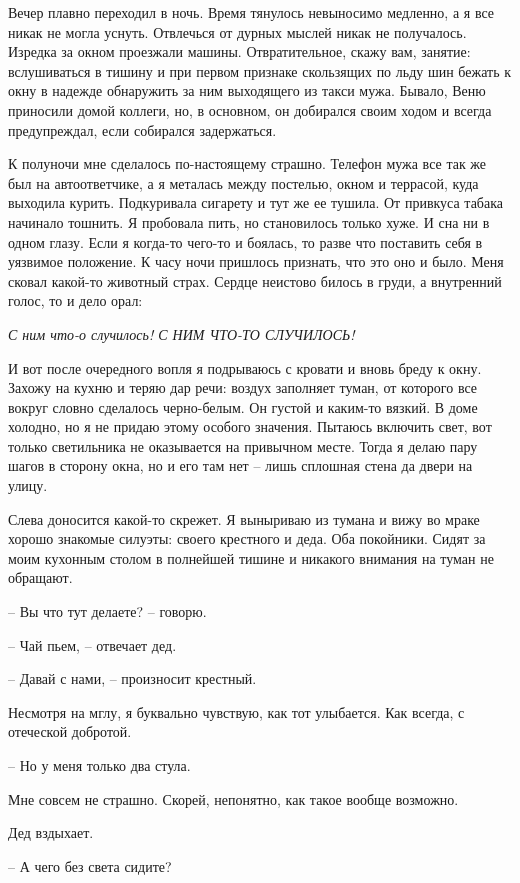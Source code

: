 \documentclass[
]{book}
\begin{document}
Вечер плавно переходил в ночь. Время тянулось невыносимо медленно, а я все никак не могла уснуть. Отвлечься от дурных мыслей никак не получалось. Изредка за окном проезжали машины. Отвратительное, скажу вам, занятие: вслушиваться в тишину и при первом признаке скользящих по льду шин бежать к окну в надежде обнаружить за ним выходящего из такси мужа. Бывало, Веню приносили домой коллеги, но, в основном, он добирался своим ходом и всегда предупреждал, если собирался задержаться.

К полуночи мне сделалось по-настоящему страшно. Телефон мужа все так же был на автоответчике, а я металась между постелью, окном и террасой, куда выходила курить. Подкуривала сигарету и тут же ее тушила. От привкуса табака начинало тошнить. Я пробовала пить, но становилось только хуже. И сна ни в одном глазу. Если я когда-то чего-то и боялась, то разве что поставить себя в уязвимое положение. К часу ночи пришлось признать, что это оно и было. Меня сковал какой-то животный страх. Сердце неистово билось в груди, а внутренний голос, то и дело орал:

\emph{С ним что-о случилось! С НИМ ЧТО-ТО СЛУЧИЛОСЬ!}

И вот после очередного вопля я подрываюсь с кровати и вновь бреду к окну. Захожу на кухню и теряю дар речи: воздух заполняет туман, от которого все вокруг словно сделалось черно-белым. Он густой и каким-то вязкий. В доме холодно, но я не придаю этому особого значения. Пытаюсь включить свет, вот только светильника не оказывается на привычном месте. Тогда я делаю пару шагов в сторону окна, но и его там нет -- лишь сплошная стена да двери на улицу.

Слева доносится какой-то скрежет. Я выныриваю из тумана и вижу во мраке хорошо знакомые силуэты: своего крестного и деда. Оба покойники. Сидят за моим кухонным столом в полнейшей тишине и никакого внимания на туман не обращают.

-- Вы что тут делаете? -- говорю.

-- Чай пьем, -- отвечает дед.

-- Давай с нами, -- произносит крестный.

Несмотря на мглу, я буквально чувствую, как тот улыбается. Как всегда, с отеческой добротой.

-- Но у меня только два стула.

Мне совсем не страшно. Скорей, непонятно, как такое вообще возможно.

Дед вздыхает.

-- А чего без света сидите?
\end{document}
